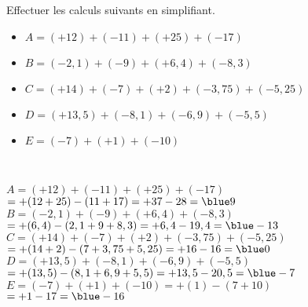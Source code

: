 \begin{exercice*}
   Effectuer les calculs suivants en simplifiant.
   \begin{itemize}
      \item[] $A =(+12) + (-11) + (+25) + (-17)$
      \item[] $B = (-2,1) + (-9) + (+6,4) + (-8,3)$
      \item[] $C = (+14) + (-7) + (+2) + (-3,75) + (-5,25)$
      \item[] $D = (+13,5) + (-8,1) + (-6,9) + (-5,5)$
      \item[] $E=(-7)+(+1)+(-10)$
   \end{itemize}
\end{exercice*}

\begin{corrige}
   \ \\ [-5mm]
   \begin{itemize}
      \def\item{}
      \item $A =(+12) + (-11) + (+25) + (-17)$ \\
         \qquad\; $=+(12+25)-(11+17) =+37-28 =\blue 9$
      \item $B = (-2,1) + (-9) + (+6,4) + (-8,3)$ \\
         \quad $=+(6,4)-(2,1+9+8,3) =+6,4-19,4 =\blue -13$
      \item $C = (+14) + (-7) + (+2) + (-3,75) + (-5,25)$ \\
         \quad $=+(14+2)-(7+3,75+5,25) =+16-16 ={\blue 0}$
      \item $D = (+13,5) + (-8,1) + (-6,9) + (-5,5)$ \\
         $=+(13,5)-(8,1+6,9+5,5) =+13,5-20,5 =\blue -7$
      \item $E=(-7)+(+1)+(-10) =+(1)-(7+10)$ \\
        \qquad\; $=+1-17 =\blue -16$
   \end{itemize}
\end{corrige}

